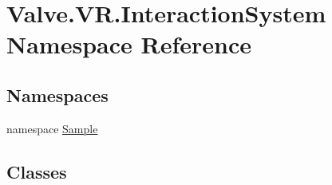 \hypertarget{namespace_valve_1_1_v_r_1_1_interaction_system}{}\section{Valve.\+V\+R.\+Interaction\+System Namespace Reference}
\label{namespace_valve_1_1_v_r_1_1_interaction_system}
\subsection*{Namespaces}
\begin{DoxyCompactItemize}
\item 
namespace \mbox{\hyperlink{namespace_valve_1_1_v_r_1_1_interaction_system_1_1_sample}{Sample}}
\end{DoxyCompactItemize}
\subsection*{Classes}
